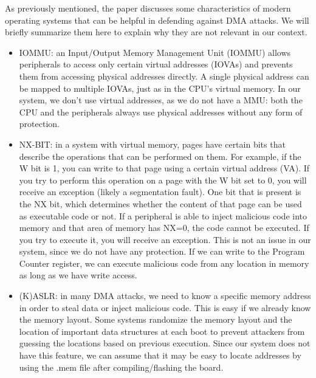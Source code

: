 As previously mentioned, the paper discusses some characteristics of modern operating systems that can be helpful in defending against DMA attacks. We will briefly summarize them here to explain why they are not relevant in our context. 
\begin{itemize}
\item IOMMU: an Input/Output Memory Management Unit (IOMMU) allows peripherals to access only certain virtual addresses (IOVAs) and prevents them from accessing physical addresses directly. A single physical address can be mapped to multiple IOVAs, just as in the CPU's virtual memory. In our system, we don't use virtual addresses, as we do not have a MMU: both the CPU and the peripherals always use physical addresses without any form of protection.
\item NX-BIT: in a system with virtual memory, pages have certain bits that describe the operations that can be performed on them. For example, if the W bit is 1, you can write to that page using a certain virtual address (VA). If you try to perform this operation on a page with the W bit set to 0, you will receive an exception (likely a segmentation fault). One bit that is present is the NX bit, which determines whether the content of that page can be used as executable code or not. If a peripheral is able to inject malicious code into memory and that area of memory has NX=0, the code cannot be executed. If you try to execute it, you will receive an exception. This is not an issue in our system, since we do not have any protection. If we can write to the Program Counter register, we can execute malicious code from any location in memory as long as we have write access. 
\item (K)ASLR: in many DMA attacks, we need to know a specific memory address in order to steal data or inject malicious code. This is easy if we already know the memory layout. Some systems randomize the memory layout and the location of important data structures at each boot to prevent attackers from guessing the locations based on previous execution. Since our system does not have this feature, we can assume that it may be easy to locate addresses by using the .mem file after compiling/flashing the board.
\end{itemize}

